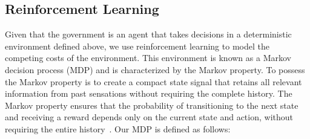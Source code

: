 \documentclass[tikz,fleqn,12pt]{wlscirep}
\begin{document}
\subsection{Reinforcement Learning}
Given that the government is an agent that takes decisions in a deterministic environment defined above, we use reinforcement learning to model the competing costs of the environment. This environment is known as a Markov decision process (MDP) and is characterized by the Markov property. To possess the Markov property is to create a compact state signal that retains all relevant information from past sensations without requiring the complete history. The Markov property ensures that the probability of transitioning to the next state and receiving a reward depends only on the current state and action, without requiring the entire history~\cite{sutton2018reinforcement}. Our MDP is defined as follows:
\end{document}
